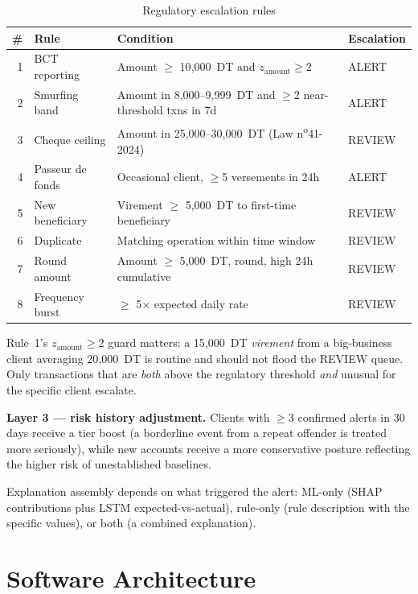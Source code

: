 \begin{table}[htbp]
\centering
\small
\caption{Regulatory escalation rules}
\begin{tabular}{@{}rp{3.3cm}p{6.4cm}l@{}}
\toprule
\# & \textbf{Rule} & \textbf{Condition} & \textbf{Escalation} \\
\midrule
1 & BCT reporting & Amount $\geq$ 10{,}000~DT and $z_{\text{amount}} \geq 2$ & ALERT \\
2 & Smurfing band & Amount in 8{,}000--9{,}999~DT and $\geq$2 near-threshold txns in 7d & ALERT \\
3 & Cheque ceiling & Amount in 25{,}000--30{,}000~DT (Law n\textsuperscript{o}41-2024) & REVIEW \\
4 & Passeur de fonds & Occasional client, $\geq$5 versements in 24h & ALERT \\
5 & New beneficiary & Virement $\geq$ 5{,}000~DT to first-time beneficiary & REVIEW \\
6 & Duplicate & Matching operation within time window & REVIEW \\
7 & Round amount & Amount $\geq$ 5{,}000~DT, round, high 24h cumulative & REVIEW \\
8 & Frequency burst & $\geq$ 5$\times$ expected daily rate & REVIEW \\
\bottomrule
\end{tabular}
\end{table}

Rule~1's $z_{\text{amount}} \geq 2$ guard matters: a 15{,}000~DT \emph{virement} from a big-business client averaging 20{,}000~DT is routine and should not flood the REVIEW queue. Only transactions that are \emph{both} above the regulatory threshold \emph{and} unusual for the specific client escalate.

\textbf{Layer 3 --- risk history adjustment.} Clients with $\geq$3 confirmed alerts in 30 days receive a tier boost (a borderline event from a repeat offender is treated more seriously), while new accounts receive a more conservative posture reflecting the higher risk of unestablished baselines.

Explanation assembly depends on what triggered the alert: ML-only (SHAP contributions plus LSTM expected-vs-actual), rule-only (rule description with the specific values), or both (a combined explanation).

\section{Software Architecture}

